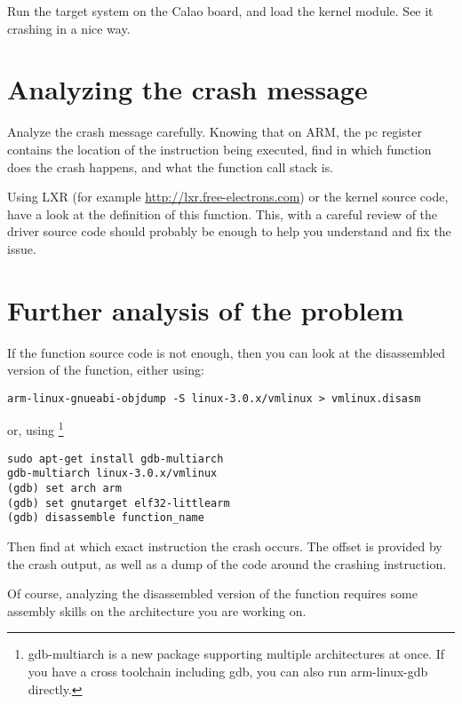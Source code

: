 Run the target system on the Calao board, and load the 
kernel module. See it crashing in a nice way.

\section{Analyzing the crash message}

Analyze the crash message carefully. Knowing that on ARM, the pc
register contains the location of the instruction being executed, find
in which function does the crash happens, and what the function call
stack is.

Using LXR (for example \url{http://lxr.free-electrons.com}) or the
kernel source code, have a look at the definition of this
function. This, with a careful review of the driver source code should
probably be enough to help you understand and fix the issue.

\section{Further analysis of the problem}

If the function source code is not enough, then you can look at the
disassembled version of the function, either using:

\begin{verbatim}
arm-linux-gnueabi-objdump -S linux-3.0.x/vmlinux > vmlinux.disasm
\end{verbatim}

or, using \footnote{gdb-multiarch is a new package
  supporting multiple architectures at once. If you have a cross
  toolchain including gdb, you can also run arm-linux-gdb directly.}

\begin{verbatim}
sudo apt-get install gdb-multiarch
gdb-multiarch linux-3.0.x/vmlinux
(gdb) set arch arm
(gdb) set gnutarget elf32-littlearm
(gdb) disassemble function_name
\end{verbatim}

Then find at which exact instruction the crash occurs. The offset is
provided by the crash output, as well as a dump of the code around the
crashing instruction.

Of course, analyzing the disassembled version of the function requires
some assembly skills on the architecture you are working on.
